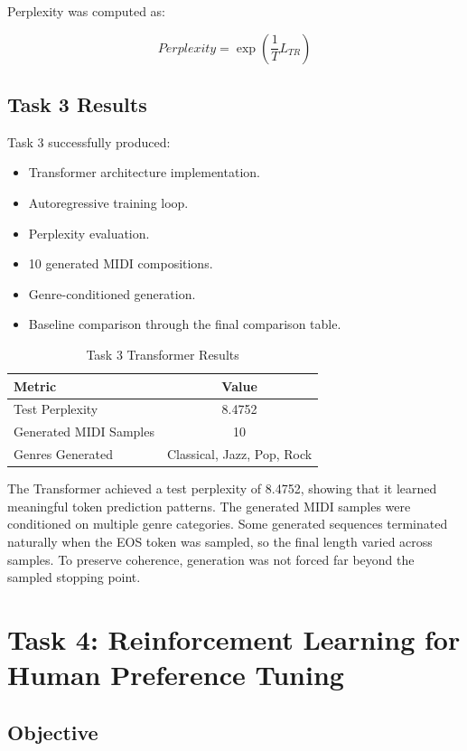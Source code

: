 \documentclass[conference]{IEEEtran}
\begin{document}
Perplexity was computed as:

\begin{equation}
Perplexity = \exp\left(\frac{1}{T}L_{TR}\right)
\end{equation}

\subsection{Task 3 Results}

Task 3 successfully produced:

\begin{itemize}
    \item Transformer architecture implementation.
    \item Autoregressive training loop.
    \item Perplexity evaluation.
    \item 10 generated MIDI compositions.
    \item Genre-conditioned generation.
    \item Baseline comparison through the final comparison table.
\end{itemize}

\begin{table}[h]
\centering
\caption{Task 3 Transformer Results}
\begin{tabular}{lc}
\toprule
Metric & Value \\
\midrule
Test Perplexity & 8.4752 \\
Generated MIDI Samples & 10 \\
Genres Generated & Classical, Jazz, Pop, Rock \\
\bottomrule
\end{tabular}
\end{table}

The Transformer achieved a test perplexity of 8.4752, showing that it learned meaningful token prediction patterns. The generated MIDI samples were conditioned on multiple genre categories. Some generated sequences terminated naturally when the EOS token was sampled, so the final length varied across samples. To preserve coherence, generation was not forced far beyond the sampled stopping point.

\section{Task 4: Reinforcement Learning for Human Preference Tuning}

\subsection{Objective}
\end{document}
